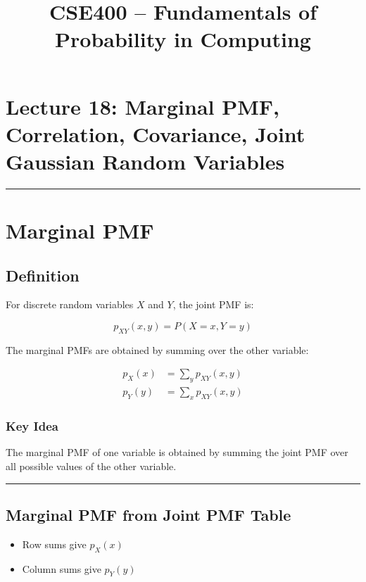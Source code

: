 \documentclass[12pt]{article}
\title{CSE400 -- Fundamentals of Probability in Computing}
\author{}
\date{}
\begin{document}
\maketitle

\section*{Lecture 18: Marginal PMF, Correlation, Covariance, Joint Gaussian Random Variables}

\hrule
\vspace{0.5cm}

\section{Marginal PMF}

\subsection{Definition}

For discrete random variables $X$ and $Y$, the joint PMF is:

\[
p_{XY}(x,y) = P(X = x, Y = y)
\]

The marginal PMFs are obtained by summing over the other variable:

\begin{align*}
p_X(x) &= \sum_y p_{XY}(x,y) \\
p_Y(y) &= \sum_x p_{XY}(x,y)
\end{align*}

\subsubsection*{Key Idea}

The marginal PMF of one variable is obtained by summing the joint PMF over all possible values of the other variable.

\hrule
\vspace{0.5cm}

\subsection{Marginal PMF from Joint PMF Table}

\begin{itemize}
\item Row sums give $p_X(x)$
\item Column sums give $p_Y(y)$
\end{itemize}
\end{document}
